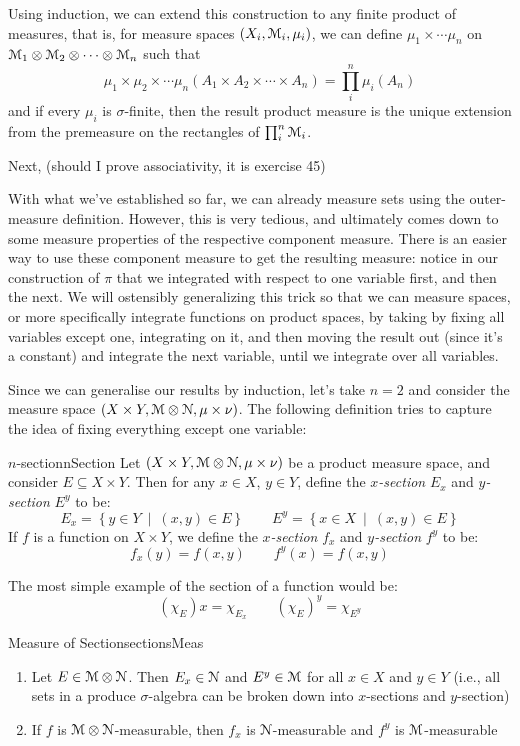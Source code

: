 \documentclass[oneside]{book}
\newcommand{\EM}{\EuScript{M}}
\newcommand{\EN}{\EuScript{N}}
\newcommand{\sse}{\subseteq}
\newcommand{\set}[2]{\left\{#1 \ \middle|\ #2\right\}}
\begin{document}
Using induction, we can extend this construction to any finite product of measures, that is, for measure spaces $(X_i,
\EM_i, \mu_i)$, we can define $\mu_1\times \cdots \mu_n$ on $\EM_1\otimes \EM_2\otimes\cdots \otimes \EM_n$ such that
\[
	\mu_1\times \mu_2\times\cdots\mu_n(A_1\times A_2\times\cdots\times A_n) = \prod_i^n\mu_i(A_n)
\]
and if every $\mu_i$ is $\sigma$-finite, then the result product measure is the unique extension from the premeasure on
the rectangles of $\prod_i^n \EM_i$. 

Next, (should I prove associativity, it is exercise 45)

With what we've established so far, we can already measure sets using the outer-measure definition. However, this is
very tedious, and ultimately comes down to some measure properties of the respective component measure. There is an
easier way to use these component measure to get the resulting measure: notice in our construction of $\pi$ that we
integrated with respect to one variable first, and then the next. We will ostensibly generalizing this trick so that we
can measure spaces, or more specifically integrate functions on product spaces, by taking by fixing all variables except
one, integrating on it, and then moving the result out (since it's a constant) and integrate the next variable, until we
integrate over all variables. 

Since we can generalise our results by induction, let's take $n = 2$ and consider the measure space $(X\times Y,
\EM\otimes \EN, \mu\times \nu)$. The following definition tries to capture the idea of fixing everything except one
variable:
\begin{defn}{$n$-section}{nSection}
	Let $(X\times Y, \EM\otimes \EN, \mu\times \nu)$ be a product measure space, and consider $E \sse X\times Y$. Then
	for any $x \in X$, $y \in Y$, define the \emph{$x$-section} $E_x$ and \emph{$y$-section} $E^y$ to be:
	\[
		E_x = \set{y \in Y}{(x,y) \in E} \qquad E^y = \set{x \in X}{(x,y) \in E}
	\]
	If $f$ is a function on $X\times Y$, we define the \emph{$x$-section} $f_x$ and \emph{$y$-section} $f^y$ to be:
	\[
		f_x(y) = f(x,y) \qquad f^y(x) = f(x,y)
	\]
\end{defn}

The most simple example of the section of a function would be:
\[
	(\chi_E)x = \chi_{E_x} \qquad (\chi_E)^y = \chi_{E^y}
\]

\begin{prop}{Measure of Section}{sectionsMeas}
	\begin{enumerate}
		\item Let $E \in \EM\otimes \EN$. Then $E_x \in \EN$ and $E^y \in \EM$ for all $x \in X$ and $y \in Y$ (i.e.,
			all sets in a produce $\sigma$-algebra can be broken down into $x$-sections and $y$-section)
		\item If $f$ is $\EM\otimes \EN$-measurable, then $f_x$ is $\EN$-measurable and $f^y$ is $\EM$-measurable
	\end{enumerate}
\end{prop}
\end{document}
